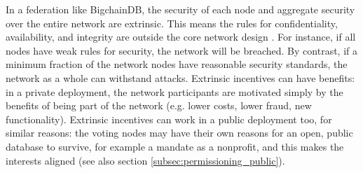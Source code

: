 In a federation like BigchainDB, the security of each node and aggregate security over the entire network are extrinsic.
This means the rules for confidentiality, availability, and integrity are outside the core network design \cite{gault2015cia_secret}.
For instance, if all nodes have weak rules for security, the network will be breached.
By contrast, if a minimum fraction of the network nodes have reasonable security standards, the network as a whole can withstand attacks.
Extrinsic incentives can have benefits: in a private deployment, the network participants are motivated simply by the benefits of being part of the network (e.g. lower costs, lower fraud, new functionality).
Extrinsic incentives can work in a public deployment too, for similar reasons: the voting nodes may have their own reasons for an open, public database to survive, for example a mandate as a nonprofit, and this makes the interests aligned (see also section \ref{subsec:permissioning_public}).